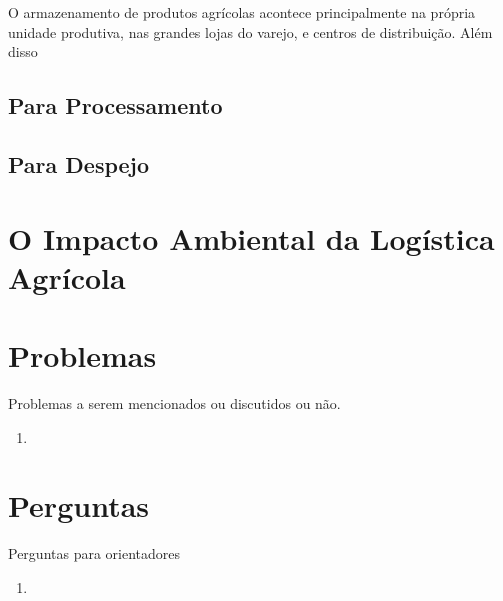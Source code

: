 \documentclass[]{article}
\begin{document}
	O armazenamento de produtos agrícolas acontece principalmente na própria unidade produtiva, nas grandes lojas do varejo, e centros de distribuição. Além disso 
	
	\subsection{Para Processamento}
	
	\subsection{Para Despejo}
	
	
	\section{O Impacto Ambiental da Logística Agrícola}
	
	\section{}
	
	
	
	
	
	
	\section{Problemas}
	
	Problemas a serem mencionados ou discutidos ou não.
	
	\begin{enumerate}

		\item 
	\end{enumerate}
	
	\section{Perguntas}
	
	Perguntas para orientadores
	
	\begin{enumerate}
		
		\item 
		
	\end{enumerate}
	
\end{document}
